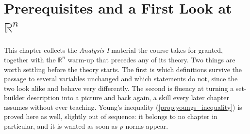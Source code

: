 \chapter{Prerequisites and a First Look at \texorpdfstring{$\mathbb{R}^n$}{Rn}}
\label{ch:prerequisites}

This chapter collects the \emph{Analysis I} material the course takes for granted, together with
the $\mathbb{R}^n$ warm-up that precedes any of its theory. Two things are worth settling before
the theory starts. The first is which definitions survive the passage to several variables
unchanged and which statements do not, since the two look alike and behave very differently. The
second is fluency at turning a set-builder description into a picture and back again, a skill
every later chapter assumes without ever teaching. Young's inequality
(\cref{prop:youngs_inequality}) is proved here as well, slightly out of sequence: it belongs to no
chapter in particular, and it is wanted as soon as $p$-norms appear.





